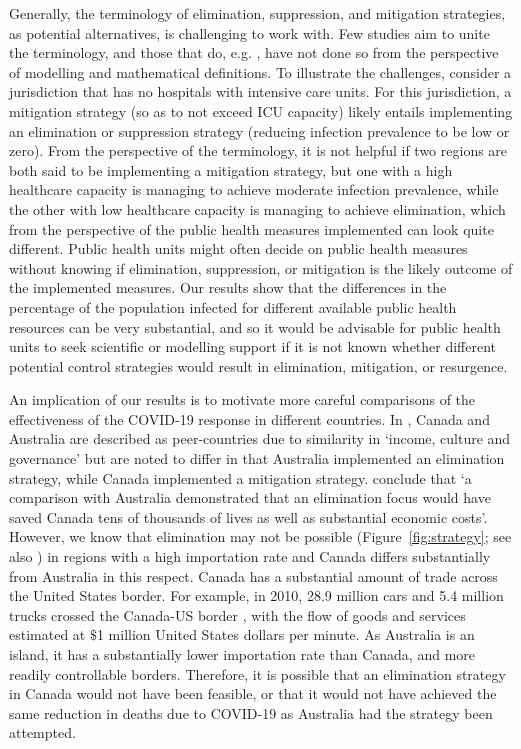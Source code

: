 \documentclass[pdflatex]{sn-jnl}
\theoremstyle{thmstyleone}%
\theoremstyle{thmstyletwo}%
\theoremstyle{thmstylethree}%
\begin{document}
Generally, the terminology of elimination, suppression, and mitigation strategies, as potential alternatives, is challenging to work with. Few studies aim to unite the terminology, and those that do, e.g. \cite{baker_elimination_2020,baker2023covid}, have not done so from the perspective of modelling and mathematical definitions. To illustrate the challenges, consider a jurisdiction that has no hospitals with intensive care units. For this jurisdiction, a mitigation strategy (so as to not exceed ICU capacity) likely entails implementing an elimination or suppression strategy (reducing infection prevalence to be low or zero). From the perspective of the terminology, it is not helpful if two regions are both said to be implementing a mitigation strategy, but one with a high healthcare capacity is managing to achieve moderate infection prevalence, while the other with low healthcare capacity is managing to achieve elimination, which from the perspective of the public health measures implemented can look quite different. Public health units might often decide on public health measures without knowing if elimination, suppression, or mitigation is the likely outcome of the implemented measures. Our results show that the differences in the percentage of the population infected for different available public health resources can be very substantial, and so it would be advisable for public health units to seek scientific or modelling support if it is not known whether different potential control strategies would result in elimination, mitigation, or resurgence.

An implication of our results is to motivate more careful comparisons of the effectiveness of the COVID-19 response in different countries. In \cite{peng2023relative}, Canada and Australia are described as peer-countries due to similarity in `income, culture and governance' but are noted to differ in that Australia implemented an elimination strategy, while Canada implemented a mitigation strategy. \cite{peng2023relative} conclude that `a comparison with Australia demonstrated that an elimination focus would have saved Canada tens of thousands of lives as well as substantial economic costs'. However, we know that elimination may not be possible (Figure~\ref{fig:strategy}; see also \citealt{martignoni_is_2024}) in regions with a high importation rate and Canada differs substantially from Australia in this respect. Canada has a substantial amount of trade across the United States border. For example, in 2010, 28.9 million cars and 5.4 million trucks crossed the Canada-US border \citep{transport_canada_2024}, with the flow of goods and services estimated at $\$$1 million United States dollars per minute. As Australia is an island, it has a substantially lower importation rate than Canada, and more readily controllable borders. Therefore, it is possible that an elimination strategy in Canada would not have been feasible, or that it would not have achieved the same reduction in deaths due to COVID-19 as Australia had the strategy been attempted.
\end{document}
